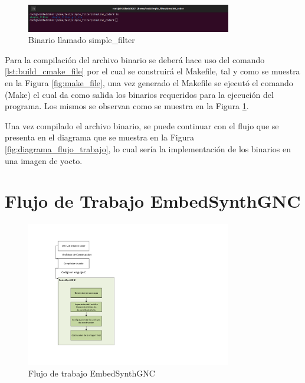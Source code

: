 \begin{figure}[h!]
    \centering
    \includegraphics[width=0.8\textwidth]{fig/especifico_2/M2MT/paso_a_paso_mtmt/binario_compilado.png}
    \caption{Binario llamado simple\_filter}
    \label{fig:binario_compilado}
\end{figure}

Para la compilación del archivo binario se deberá hace uso del comando \ref{lst:build_cmake_file} por el cual se construirá el Makefile, tal y como se muestra en la Figura \ref{fig:make_file}, una vez generado el Makefile se ejecutó el comando (Make) el cual da como salida los binarios requeridos para la ejecución del programa. Los mismos se observan como se muestra en la Figura \ref{fig:binario_compilado}.

Una vez compilado el archivo binario, se puede continuar con el flujo que se presenta en el diagrama que se muestra en la Figura \ref{fig:diagrama_flujo_trabajo}, lo cual sería la implementación de los binarios en una imagen de yocto.
\newpage

\section{Flujo de Trabajo EmbedSynthGNC}

\begin{figure}[h!]
    \centering
    \includegraphics[width=0.8\textwidth]{fig/especifico_2/embedsynthgnc/diagrama_general_embedsynthgnc.pdf}
    \caption{Flujo de trabajo EmbedSynthGNC}
    \label{fig:diagrama_embed_synth_gnc}
\end{figure}

